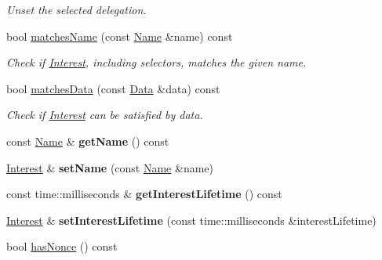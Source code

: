 \begin{DoxyCompactItemize}
\begin{DoxyCompactList}\small\item\em Unset the selected delegation. \end{DoxyCompactList}\item 
bool \hyperlink{classndn_1_1Interest_a38a856669037da1bf22d17469ed818d4}{matches\+Name} (const \hyperlink{classndn_1_1Name}{Name} \&name) const
\begin{DoxyCompactList}\small\item\em Check if \hyperlink{classndn_1_1Interest}{Interest}, including selectors, matches the given {\ttfamily name}. \end{DoxyCompactList}\item 
bool \hyperlink{classndn_1_1Interest_a625e8ed587c87bdb236b15395fdd3067}{matches\+Data} (const \hyperlink{classndn_1_1Data}{Data} \&data) const
\begin{DoxyCompactList}\small\item\em Check if \hyperlink{classndn_1_1Interest}{Interest} can be satisfied by {\ttfamily data}. \end{DoxyCompactList}\item 
const \hyperlink{classndn_1_1Name}{Name} \& {\bfseries get\+Name} () const\hypertarget{classndn_1_1Interest_a8cb4cbd5a1b32cdfc7c88c43e6cabc27}{}\label{classndn_1_1Interest_a8cb4cbd5a1b32cdfc7c88c43e6cabc27}

\item 
\hyperlink{classndn_1_1Interest}{Interest} \& {\bfseries set\+Name} (const \hyperlink{classndn_1_1Name}{Name} \&name)\hypertarget{classndn_1_1Interest_a2468c89ab122b6e3a069dbecf6a49b28}{}\label{classndn_1_1Interest_a2468c89ab122b6e3a069dbecf6a49b28}

\item 
const time\+::milliseconds \& {\bfseries get\+Interest\+Lifetime} () const\hypertarget{classndn_1_1Interest_a3fca4a33fa4b01db27a630f9bfe7123e}{}\label{classndn_1_1Interest_a3fca4a33fa4b01db27a630f9bfe7123e}

\item 
\hyperlink{classndn_1_1Interest}{Interest} \& {\bfseries set\+Interest\+Lifetime} (const time\+::milliseconds \&interest\+Lifetime)\hypertarget{classndn_1_1Interest_a8051dba7b3eccf191a5f06bf878346d5}{}\label{classndn_1_1Interest_a8051dba7b3eccf191a5f06bf878346d5}

\item 
bool \hyperlink{classndn_1_1Interest_a7f18fe59175c1bcceaea17cd3719fa0d}{has\+Nonce} () const\hypertarget{classndn_1_1Interest_a7f18fe59175c1bcceaea17cd3719fa0d}{}\label{classndn_1_1Interest_a7f18fe59175c1bcceaea17cd3719fa0d}


\end{DoxyCompactItemize}

